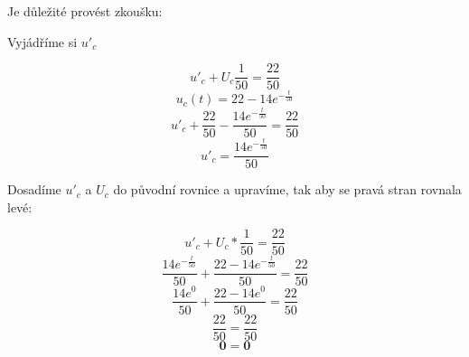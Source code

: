 Je důležité provést zkoušku:
\newline

Vyjádříme si $u'_c$

    $$u'_c + U_c\frac{1}{50} = \frac{22}{50}$$
    $$u_c(t) = 22 - 14e^{-\frac{t}{50}}$$
    $$u'_c + \frac{22}{50} - \frac{14e^{-\frac{t}{50}}}{50} = \frac{22}{50}$$
    $$u'_c = \frac{14e^{-\frac{t}{50}}}{50}$$

\newpage

Dosadíme $u'_c$ a $U_c$ do původní rovnice a upravíme, tak aby se pravá stran rovnala levé:

    $$u'_c + U_c * \frac{1}{50} = \frac{22}{50}$$
    $$\frac{14e^{-\frac{t}{50}}}{50} + \frac{22 - 14e^{-\frac{t}{50}}}{50} = \frac{22}{50}$$
    $$\frac{14e^{0}}{50} + \frac{22 - 14e^{0}}{50} = \frac{22}{50}$$
    $$\frac{22}{50} = \frac{22}{50}$$
    $$\mathbf{0} = \mathbf{0}$$